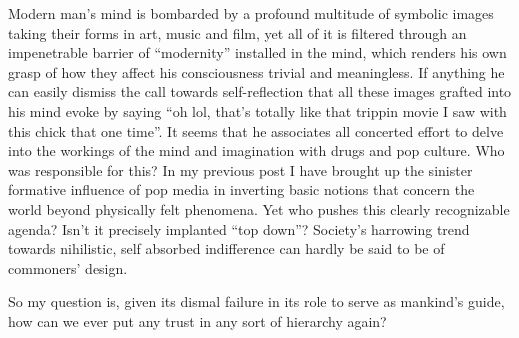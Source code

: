 \begin{footnotesize}
\begin{sffamily}
Modern man's mind is bombarded by a profound multitude of symbolic images taking their forms in art, music and film, yet all of it is filtered through an impenetrable barrier of ``modernity'' installed in the mind, which renders his own grasp of how they affect his consciousness trivial and meaningless. If anything he can easily dismiss the call towards self-reflection that all these images grafted into his mind evoke by saying ``oh lol, that's totally like that trippin movie I saw with this chick that one time''. It seems that he associates all concerted effort to delve into the workings of the mind and imagination with drugs and pop culture. Who was responsible for this? In my previous post I have brought up the sinister formative influence of pop media in inverting basic notions that concern the world beyond physically felt phenomena. Yet who pushes this clearly recognizable agenda? Isn't it precisely implanted ``top down''? Society's harrowing trend towards nihilistic, self absorbed indifference can hardly be said to be of commoners' design.

So my question is, given its dismal failure in its role to serve as mankind's guide, how can we ever put any trust in any sort of hierarchy again?

\end{sffamily}
\end{footnotesize}

